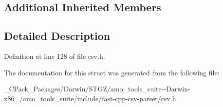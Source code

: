 \subsection*{Additional Inherited Members}


\subsection{Detailed Description}


Definition at line 128 of file csv.\+h.



The documentation for this struct was generated from the following file\+:\begin{DoxyCompactItemize}
\item 
\+\_\+\+C\+Pack\+\_\+\+Packages/\+Darwin/\+S\+T\+G\+Z/amo\+\_\+tools\+\_\+suite-\/-\/\+Darwin-\/x86\+\_/amo\+\_\+tools\+\_\+suite/include/fast-\/cpp-\/csv-\/parser/csv.\+h\end{DoxyCompactItemize}
